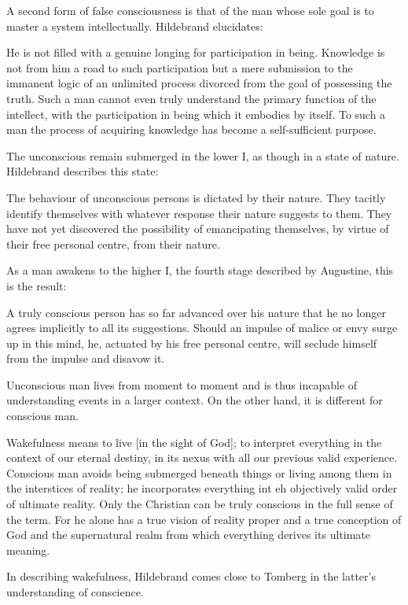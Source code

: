 A second form of false consciousness is that of the man whose sole goal is to master a system intellectually. Hildebrand elucidates:

\begin{quotex}
He is not filled with a genuine longing for participation in being. Knowledge is not from him a road to such participation but a mere submission to the immanent logic of an unlimited process divorced from the goal of possessing the truth. Such a man cannot even truly understand the primary function of the intellect, with the participation in being which it embodies by itself. To such a man the process of acquiring knowledge has become a self-sufficient purpose.

\end{quotex}
The unconscious remain submerged in the lower I, as though in a state of nature. Hildebrand describes this state:

\begin{quotex}
The behaviour of unconscious persons is dictated by their nature. They tacitly identify themselves with whatever response their nature suggests to them. They have not yet discovered the possibility of emancipating themselves, by virtue of their free personal centre, from their nature.

\end{quotex}
As a man awakens to the higher I, the fourth stage described by Augustine, this is the result:

\begin{quotex}
A truly conscious person has so far advanced over his nature that he no longer agrees implicitly to all its suggestions. Should an impulse of malice or envy surge up in this mind, he, actuated by his free personal centre, will seclude himself from the impulse and disavow it.

\end{quotex}
Unconscious man lives from moment to moment and is thus incapable of understanding events in a larger context. On the other hand, it is different for conscious man.

\begin{quotex}
Wakefulness means to live [in the sight of God]; to interpret everything in the context of our eternal destiny, in its nexus with all our previous valid experience. Conscious man avoids being submerged beneath things or living among them in the interstices of reality; he incorporates everything int eh objectively valid order of ultimate reality. Only the Christian can be truly conscious in the full sense of the term. For he alone has a true vision of reality proper and a true conception of God and the supernatural realm from which everything derives its ultimate meaning.

\end{quotex}
In describing wakefulness, Hildebrand comes close to Tomberg in the latter's understanding of conscience.

